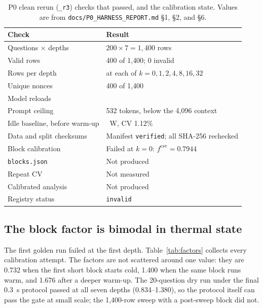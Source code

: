 \documentclass[a4paper,fleqn]{cas-sc}
\begin{document}
\begin{table}[pos=htbp]
  \centering
  \caption{P0 clean rerun (\texttt{\_r3}) checks that passed, and the calibration state. Values
  are from \texttt{docs/P0\_HARNESS\_REPORT.md} \S1, \S2, and \S6.}
  \label{tab:p0pass}
  \small
  \begin{tabularx}{\textwidth}{>{\raggedright\arraybackslash}p{6.2cm}>{\raggedright\arraybackslash}X}
    \toprule
    \textbf{Check} & \textbf{Result} \\
    \midrule
    Questions $\times$ depths & $200\times7=1{,}400$ rows \\
    Valid rows & 1{,}400 of 1{,}400; 0 invalid \\
    Rows per depth & 200 at each of $k=0,1,2,4,8,16,32$ \\
    Unique nonces & 1{,}400 of 1{,}400 \\
    Model reloads & 0 \\
    Prompt ceiling & 3{,}532 tokens, below the 4{,}096 context \\
    Idle baseline, before warm-up & 15.573~W, CV 1.12\% \\
    Data and split checksums & Manifest \texttt{verified}; all SHA-256 rechecked \\
    Block calibration & Failed at $k=0$: $f^{\mathrm{csv}}=0.7944$ \\
    \texttt{blocks.json} & Not produced \\
    Repeat CV & Not measured \\
    Calibrated analysis & Not produced \\
    Registry status & \texttt{invalid} \\
    \bottomrule
  \end{tabularx}
\end{table}

\subsection{The block factor is bimodal in thermal state}

The first golden run failed at the first depth. Table~\ref{tab:factors} collects every
calibration attempt. The factors are not scattered around one value: they are 0.732 when the
first short block starts cold, 1.400 when the same block runs warm, and 1.676 after a deeper
warm-up. The 20-question dry run under the final 0.3~s protocol passed at all seven depths
(0.834--1.380), so the protocol itself can pass the gate at small scale; the 1{,}400-row sweep
with a post-sweep block did not.
\end{document}
